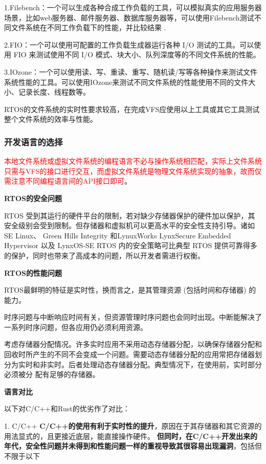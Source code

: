 \documentclass[UTF8,a4paper]{ctexart}
\begin{document}
	1.Filebench：一个可以生成各种合成工作负载的工具，可以模拟真实的应用服务器场景，比如web服务器、邮件服务器、数据库服务器等，可以使用Filebench测试不同文件系统在不同工作负载下的性能，并比较结果 .
	
	2.FIO：一个可以使用可配置的工作负载生成器运行各种 I/O 测试的工具。可以使用 FIO 来测试使用不同 I/O 模式、块大小、队列深度等的不同文件系统的性能。
	
	3.IOzone：一个可以使用读、写、重读、重写、随机读/写等各种操作来测试文件系统性能的工具。可以使用IOzone来测试不同文件系统的性能使用不同的文件大小、记录长度、线程数等。
	
	RTOS的文件系统的实时性要求较高，在完成VFS应使用以上工具或其它工具测试整个文件系统的效率与性能。
	
	\subsubsection{开发语言的选择}
	\textcolor{red}{本地文件系统或虚拟文件系统的编程语言不必与操作系统相匹配，实际上文件系统只需与VFS的接口进行交互，而虚拟文件系统是物理文件系统实现的抽象，故而仅需注意不同编程语言间的API接口即可}。
	
	\textbf{RTOS的安全问题}
	
	RTOS 受到其运行的硬件平台的限制，若对缺少存储器保护的硬件加以保护，其安全级别会受到限制。但存储器和虚拟机可以更高水平的安全性支持引导。诸如 SE Linux、 Green Hills Integrity 和LynuxWorks LynxSecure Embedded Hypervisor 以及 LynxOS-SE RTOS 内的安全策略可比典型 RTOS 提供可靠得多的保护，同时也带来了高成本的问题，所以开发者需进行权衡。
	
	\textbf{RTOS的性能问题}
	
	RTOS最鲜明的特征是实时性，换而言之，是其管理资源 (包括时间和存储器) 的能力。
	
	时序问题与中断响应时间有关，但资源管理时序问题也会同时出现。中断能解决了一系列时序问题，但各应用仍必须利用资源。
	 
	考虑存储器分配情况。许多实时应用不采用动态存储器分配，以确保存储器分配和回收时所产生的不同不会变成一个问题。需要动态存储器分配的应用常把存储器划分为实时和非实时。后者处理动态存储器分配。典型情况下，在使用前，实时部分必须被分 配有足够的存储器。
	
	\textbf{语言对比}
	
	以下对C/C++和Rust的优劣作了对比：
	
	1. C/C++
	\textbf{C/C++的使用有利于实时性的提升}，原因在于其存储器和其它资源的用法显式的，且更接近底层，能直接操作硬件。
	\textbf{但同时，在C/C++开发出来的年代，安全性问题并未得到和性能问题一样的重视导致其很容易出现漏洞}，包括但不限于以下
	
\end{document}
